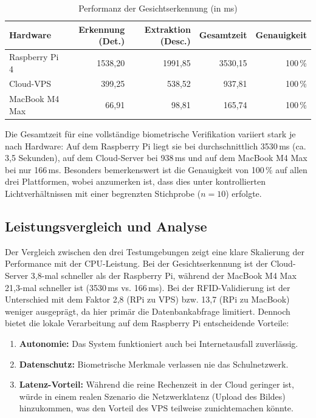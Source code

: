 \begin{table}[H]
\centering
\caption{Performanz der Gesichtserkennung (in ms)}
\label{tab:face_results}
\begin{tabular}{lrrrr}
\toprule
Hardware & Erkennung (Det.) & Extraktion (Desc.) & Gesamtzeit & Genauigkeit \\
\midrule
Raspberry Pi 4 & 1538,20 & 1991,85 & 3530,15 & 100\,\% \\
Cloud-VPS      & 399,25  & 538,52  & 937,81  & 100\,\% \\
MacBook M4 Max & 66,91   & 98,81   & 165,74  & 100\,\% \\
\bottomrule
\end{tabular}
\end{table}

Die Gesamtzeit für eine vollständige biometrische Verifikation variiert stark je nach Hardware: Auf dem Raspberry Pi liegt sie bei durchschnittlich 3530\,ms (ca. 3,5 Sekunden), auf dem Cloud-Server bei 938\,ms und auf dem MacBook M4 Max bei nur 166\,ms. Besonders bemerkenswert ist die Genauigkeit von 100\,\% auf allen drei Plattformen, wobei anzumerken ist, dass dies unter kontrollierten Lichtverhältnissen mit einer begrenzten Stichprobe ($n = 10$) erfolgte.

\subsection{Leistungsvergleich und Analyse}
\label{subsec:leistungsvergleich}

Der Vergleich zwischen den drei Testumgebungen zeigt eine klare Skalierung der Performance mit der CPU-Leistung. Bei der Gesichtserkennung ist der Cloud-Server 3,8-mal schneller als der Raspberry Pi, während der MacBook M4 Max 21,3-mal schneller ist (3530\,ms vs. 166\,ms). Bei der RFID-Validierung ist der Unterschied mit dem Faktor 2,8 (RPi zu VPS) bzw. 13,7 (RPi zu MacBook) weniger ausgeprägt, da hier primär die Datenbankabfrage limitiert. Dennoch bietet die lokale Verarbeitung auf dem Raspberry Pi entscheidende Vorteile:

\begin{enumerate}
    \item \textbf{Autonomie:} Das System funktioniert auch bei Internetausfall zuverlässig.
    \item \textbf{Datenschutz:} Biometrische Merkmale verlassen nie das Schulnetzwerk.
    \item \textbf{Latenz-Vorteil:} Während die reine Rechenzeit in der Cloud geringer ist, würde in einem realen Szenario die Netzwerklatenz (Upload des Bildes) hinzukommen, was den Vorteil des VPS teilweise zunichtemachen könnte.
\end{enumerate}

